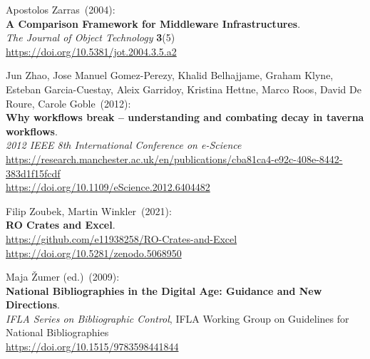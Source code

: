 \begin{thebibliography}{9}
Apostolos Zarras~(2004): \\
\textbf{A {Comparison Framework} for {Middleware Infrastructures}}. \\
\emph{The Journal of Object Technology} \textbf{3}(5) \\
\url{https://doi.org/10.5381/jot.2004.3.5.a2}

Jun Zhao, Jose Manuel Gomez-Perezy, Khalid Belhajjame, Graham
Klyne, Esteban Garcia-Cuestay, Aleix Garridoy, Kristina Hettne, Marco
Roos, David De Roure, Carole Goble~(2012): \\
\textbf{Why workflows break -- understanding and combating decay in
taverna workflows}.\\
\emph{2012 IEEE 8th International Conference on e-Science}\\
\url{https://research.manchester.ac.uk/en/publications/cba81ca4-e92c-408e-8442-383d1f15fcdf}\\
\url{https://doi.org/10.1109/eScience.2012.6404482}

Filip Zoubek, Martin Winkler~(2021): \\
\textbf{RO Crates and Excel}.\\
\url{https://github.com/e11938258/RO-Crates-and-Excel}\\
\url{https://doi.org/10.5281/zenodo.5068950}

Maja Žumer (ed.)~(2009): \\
\textbf{National Bibliographies in the Digital Age: Guidance and New
Directions}.\\
\emph{IFLA Series on Bibliographic Control}, IFLA Working Group on
Guidelines for National Bibliographies\\
\url{https://doi.org/10.1515/9783598441844}

\end{thebibliography}

\makeatother

